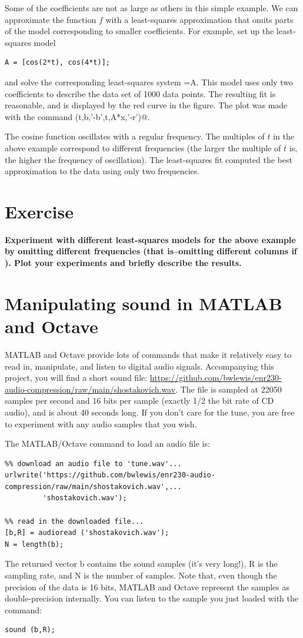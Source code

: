 \documentclass[10pt]{article}
\begin{document}
Some of the coefficients are not as large as others in this simple example.
We can approximate the function $f$ with a least-squares approximation that
omits parts of the model corresponding to smaller coefficients.
For example, set up the least-squares model
\begin{verbatim}
A = [cos(2*t), cos(4*t)];
\end{verbatim}
and solve the corresponding least-squares system 
{\verb@x=A\b@}. 
This model uses only two coefficients to describe the data set of 1000
data points. The resulting fit is reasonable, and is displayed by the red
curve in the figure. The plot was made with the command
{\verb@plot (t,b,'-b',t,A*x,'-r')@}.

The cosine function oscillates with a regular frequency. The multiples of
$t$ in the above example correspond to different frequencies (the larger
the multiple of $t$ is, the higher the frequency of oscillation). 
The least-squares
fit computed the best approximation to the data using only two 
frequencies. 

\section*{Exercise}

{\bf Experiment with different least-squares models for the above example by
omitting different frequencies (that is--omitting different columns if
\verb@A@). Plot your experiments and briefly describe the results.}



\section*{Manipulating sound in MATLAB and Octave}

MATLAB and Octave provide lots of commands that make it relatively easy to read
in, manipulate, and listen to digital audio signals.  Accompanying this
project, you will find a short sound file:
\url{https://github.com/bwlewis/enr230-audio-compression/raw/main/shostakovich.wav}.
The file is sampled at 22050 samples per second and 16 bits per sample (exactly
1/2 the bit rate of CD audio), and is about 40 seconds long.  If you don't care
for the tune, you are free to experiment with any audio samples that you wish. 

The MATLAB/Octave command to load an audio file is:
\begin{verbatim}
%% download an audio file to 'tune.wav'...
urlwrite('https://github.com/bwlewis/enr230-audio-compression/raw/main/shostakovich.wav',...
         'shostakovich.wav');

%% read in the downloaded file...
[b,R] = audioread ('shostakovich.wav');
N = length(b);
\end{verbatim}
The returned vector b contains the sound samples (it's very long!), R is the
sampling rate, and N is the number of samples. Note that, even though the
precision of the data is 16 bits, MATLAB and Octave represent the samples as
double-precision internally. You can listen to the sample you just loaded with
the command:
\begin{verbatim}
sound (b,R);
\end{verbatim}
\end{document}
